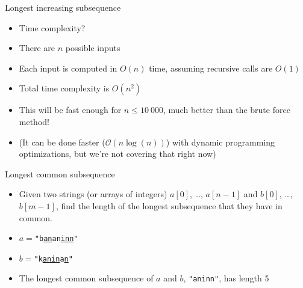 \documentclass{beamer}
\begin{document}
\begin{frame}[plain]{Longest increasing subsequence}
    \vspace{30pt}
    \begin{itemize}
        \item Time complexity?
            \vspace{10pt}
        \item There are $n$ possible inputs
        \item Each input is computed in $O(n)$ time, assuming recursive calls are $O(1)$
        \item Total time complexity is $O(n^2)$
            \vspace{10pt}
        \item This will be fast enough for $n \leq 10\ 000$, much better than the brute force method!
        \item (It can be done faster ($\mathcal{O}(n\log(n))$) with dynamic programming optimizations, but we're not covering that right now)
    \end{itemize}
\end{frame}


\begin{frame}[plain]{Longest common subsequence}
    \vspace{20pt}
    \begin{itemize}
\item Given two strings (or arrays of integers) $a[0]$, \ldots, $a[n-1]$ and $b[0]$, \ldots, $b[m-1]$, find the length of the longest subsequence that they have in common.

    \vspace{10pt}
\item $a = $\texttt{"b\underline{an}an\underline{inn}"}
\item $b = $\texttt{"k\underline{anin}a\underline{n}"}
    \vspace{5pt}
\item The longest common subsequence of $a$ and $b$, \texttt{"aninn"}, has length 5
    \end{itemize}
\end{frame}
\end{document}
